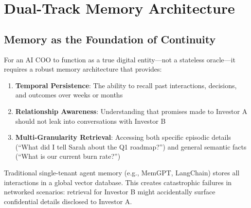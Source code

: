\chapter{Dual-Track Memory Architecture}
\label{chapter:memory_system}






\section{Memory as the Foundation of Continuity}

For an AI COO to function as a true digital entity—not a stateless oracle—it requires a robust memory architecture that provides:

\begin{enumerate}
    \item \textbf{Temporal Persistence}: The ability to recall past interactions, decisions, and outcomes over weeks or months
    \item \textbf{Relationship Awareness}: Understanding that promises made to Investor A should not leak into conversations with Investor B
    \item \textbf{Multi-Granularity Retrieval}: Accessing both specific episodic details (``What did I tell Sarah about the Q1 roadmap?'') and general semantic facts (``What is our current burn rate?'')
\end{enumerate}

Traditional single-tenant agent memory (e.g., MemGPT, LangChain) stores all interactions in a global vector database. This creates catastrophic failures in networked scenarios: retrieval for Investor B might accidentally surface confidential details disclosed to Investor A.

